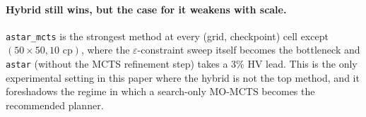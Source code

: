 \paragraph{Hybrid still wins, but the case for it weakens with scale.} \texttt{astar\_mcts} is the strongest method at every (grid, checkpoint) cell except $(50 \times 50, 10\text{ cp})$, where the $\varepsilon$-constraint sweep itself becomes the bottleneck and \texttt{astar} (without the MCTS refinement step) takes a $3\%$ HV lead. This is the only experimental setting in this paper where the hybrid is not the top method, and it foreshadows the regime in which a search-only MO-MCTS becomes the recommended planner.
